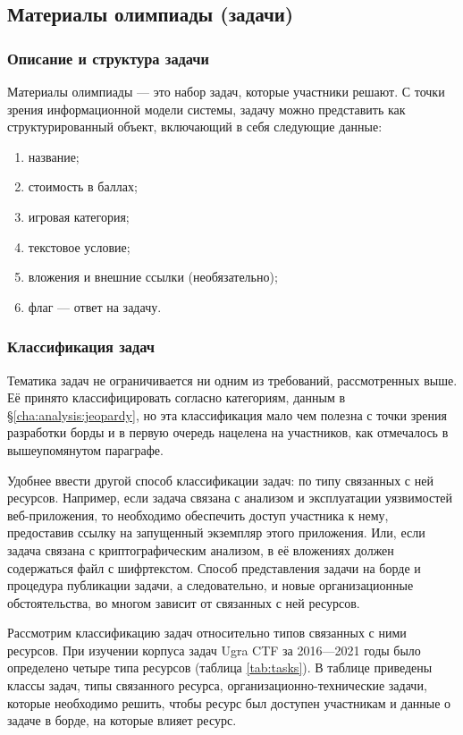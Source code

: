 \subsection{Материалы олимпиады (задачи)}

\subsubsection{Описание и структура задачи}

Материалы олимпиады — это набор задач, которые участники решают. С точки зрения информационной модели системы, задачу можно представить как структурированный объект, включающий в себя следующие данные:

\begin{enumerate}
\item название;
\item стоимость в баллах;
\item игровая категория;
\item текстовое условие;
\item вложения и внешние ссылки (необязательно);
\item флаг — ответ на задачу.
\end{enumerate}

\subsubsection{Классификация задач}
\label{cha:the:classes}

Тематика задач не ограничивается ни одним из требований, рассмотренных выше. Её принято классифицировать согласно категориям, данным в §\ref{cha:analysis:jeopardy}, но эта классификация мало чем полезна с точки зрения разработки борды и в первую очередь нацелена на участников, как отмечалось в вышеупомянутом параграфе.

Удобнее ввести другой способ классификации задач: по типу связанных с ней ресурсов. Например, если задача связана с анализом и эксплуатации уязвимостей веб-приложения, то необходимо обеспечить доступ участника к нему, предоставив ссылку на запущенный экземпляр этого приложения. Или, если задача связана с криптографическим анализом, в её вложениях должен содержаться файл с шифртекстом. Способ представления задачи на борде и процедура публикации задачи, а следовательно, и новые организационные обстоятельства, во многом зависит от связанных с ней ресурсов.

Рассмотрим классификацию задач относительно типов связанных с ними ресурсов. При изучении корпуса задач Ugra CTF за 2016---2021 годы \cite{UgraRepos} было определено четыре типа ресурсов (таблица \ref{tab:tasks}). В таблице приведены классы задач, типы связанного ресурса, организационно-технические задачи, которые необходимо решить, чтобы ресурс был доступен участникам и данные о задаче в борде, на которые влияет ресурс.


